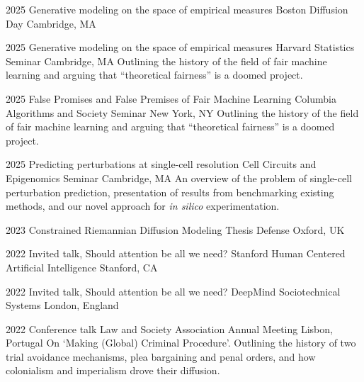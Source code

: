 

\begin{cvhonors}

    \cvhonor
    {2025} %
    {Generative modeling on the space of empirical measures} %
    {Boston Diffusion Day} %
    {Cambridge, MA} %

    \cvhonor
    {2025} %
    {Generative modeling on the space of empirical measures} %
    {Harvard Statistics Seminar} %
    {Cambridge, MA} %
    {Outlining the history of the field of fair machine learning and arguing that ``theoretical fairness'' is a doomed project.}
    
    \cvhonor
    {2025} %
    {False Promises and False Premises of Fair Machine Learning} %
    {Columbia Algorithms and Society Seminar} %
    {New York, NY} %
    {Outlining the history of the field of fair machine learning and arguing that ``theoretical fairness'' is a doomed project.}
    
    \cvhonor
    {2025} %
    {Predicting perturbations at single-cell resolution} %
    {Cell Circuits and Epigenomics Seminar} %
    {Cambridge, MA} %
    {An overview of the problem of single-cell perturbation prediction, presentation of results from benchmarking existing methods, and our novel approach for \textit{in silico} experimentation.}

    \cvhonor
    {2023} %
    {Constrained Riemannian Diffusion Modeling} %
    {Thesis Defense} %
    {Oxford, UK} %

    \cvhonorstub
    {2022} %
    {Invited talk, Should attention be all we need?} %
    {Stanford Human Centered Artificial Intelligence} %
    {Stanford, CA} %
    

    \cvhonorstub
    {2022} %
    {Invited talk, Should attention be all we need?} %
    {DeepMind Sociotechnical Systems} %
    {London, England} %
    

    \cvhonor
    {2022} %
    {Conference talk} %
    {Law and Society Association Annual Meeting} %
    {Lisbon, Portugal} %
    {On `Making (Global) Criminal Procedure'. Outlining the history of two trial avoidance mechanisms, plea bargaining and penal orders, and how colonialism and imperialism drove their diffusion.}
    

\end{cvhonors}
